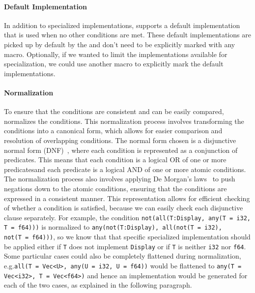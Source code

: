 \paragraph{Default Implementation}
In addition to specialized implementations, \mytool{} supports a default implementation that is used when no other conditions are met.
These default implementations are picked up by default by the  and don't need to be explicitly marked with any macro.
Optionally, if we wanted to limit the implementations available for specialization, we could use another macro to explicitly mark the default implementations.

\paragraph{Normalization}
To ensure that the conditions are consistent and can be easily compared, \mytool{} normalizes the conditions.
This normalization process involves transforming the conditions into a canonical form, which allows for easier comparison and resolution of overlapping conditions.
The normal form chosen is a disjunctive normal form (DNF)~\cite{DNFPost21}, where each condition is represented as a conjunction of predicates.
This means that each condition is a logical OR of one or more predicatesand each predicate is a logical AND of one or more atomic conditions.
The normalization process also involves applying De Morgan's laws~\cite{DeMorgan} to push negations down to the atomic conditions, ensuring that the conditions are expressed in a consistent manner.
This representation allows for efficient checking of whether a condition is satisfied, because we can easily check each disjunctive clause separately.
For example, the condition \texttt{not(all(\mbox{T:\@ Display}, any(\mbox{T = i32}, \mbox{T = f64})))} is normalized to \texttt{any(not(\mbox{T:\@ Display}), all(not(\mbox{T = i32}), not(\mbox{T = f64})))}, so we know that that specific specialized implementation should be applied either if \texttt{T} does not implement \texttt{Display} or if \texttt{T} is neither \texttt{i32} nor \texttt{f64}.
Some particular cases could also be completely flattened during normalization, e.g.\@ \texttt{all(T = Vec<U>, any(U = i32, U = f64))} would be flattened to \texttt{any(T = Vec<i32>, T = Vec<f64>)} and hence an implementation would be generated for each of the two cases, as explained in the following paragraph.

